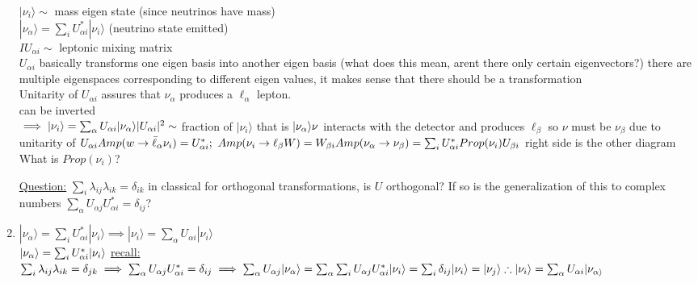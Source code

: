 \documentclass[12pt]{amsart}
\begin{document}
\begin{enumerate}
$|\nu_i \rangle \sim$ mass eigen state (since neutrinos have mass)\\
$| \nu_{\alpha} \rangle = \sum_i U_{\alpha i}^* | \nu_i \rangle$ (neutrino state emitted)\\
$IU_{\alpha i} \sim$ leptonic mixing matrix\\
$U_{\alpha i}$ basically transforms one eigen basis into another eigen basis (what does this mean, arent there only certain eigenvectors?) there are multiple eigenspaces corresponding to different eigen values, it makes sense that there should be a transformation\\
Unitarity of $U_{\alpha i}$ assures that $\nu_{\alpha}$ produces a $\ell_{\alpha}$ lepton.\\
can be inverted \\
$\implies | \nu_i \rangle = \sum_{\alpha} U_{\alpha i} | \nu_{\alpha} \rangle\\
| U_{\alpha i}|^2 \sim$ fraction of $| \nu_i \rangle$ that is $| \nu_{\alpha} \rangle\\
\nu$ interacts with the detector and produces $\ell_{\beta}$ so $\nu$ must be $\nu_{\beta}$ due to unitarity of $U_{\alpha i}\\
Amp(w \rightarrow \bar{\ell}_{\alpha} \nu_i ) = U_{\alpha i}^*;\,\, Amp(\nu_i \rightarrow \ell_{\beta} W) = W_{\beta i}\\
Amp (\nu_{\alpha} \rightarrow \nu_{\beta}) = \sum_i U_{\alpha i}^* Prop(\nu_i) U_{\beta i}\\$
right side is the other diagram\\
What is $Prop(\nu_i)$?\\


\hdashrule[0.5ex][c]{\linewidth}{0.5pt}{1.5mm}

\underline{Question:} $\sum_i \lambda_{ij} \lambda_{ik} = \delta_{ik}$ in classical for orthogonal transformations, is $U$ orthogonal? If so is the generalization of this to complex numbers $\sum_{\alpha} U_{\alpha j} U_{\alpha i}^* = \delta_{ij}$?


\hdashrule[0.5ex][c]{\linewidth}{0.5pt}{1.5mm}


\item \underline{$|\nu_{\alpha} \rangle=\sum_i U_{\alpha i}^* | \nu_i \rangle \implies | \nu_i \rangle = \sum_{\alpha} U_{\alpha i} | \nu_i \rangle$}\\
$| \nu_{\alpha} \rangle = \sum_i U_{\alpha i}^* | \nu_i \rangle\\$
\underline{recall:} $\sum_i \lambda_{ij} \lambda_{ik} = \delta_{jk} \implies \sum_{\alpha} U_{\alpha j} U_{\alpha i}^* = \delta_{ij}\\
\implies \sum_{\alpha} U_{\alpha j} | \nu_{\alpha} \rangle = \sum_{\alpha} \sum_i U_{\alpha j} U_{\alpha i}^* | \nu_i \rangle\\
= \sum_i \delta_{ij} | \nu_i \rangle = |\nu_j \rangle\\
\therefore | \nu_i \rangle = \sum_{\alpha} U_{\alpha i} | \nu_{\alpha \rangle}$



\end{enumerate}
\end{document}
